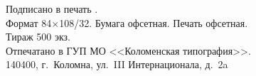\vfill
\centering
\begin{minipage}{0.8\tw}
	\small
	\centering
	Подписано в печать \signed.\\
	Формат 84$\times$108/32. Бумага офсетная. Печать офсетная.\\
	Тираж 500 экз.\\ 
	Отпечатано в ГУП МО <<Коломенская типография>>.\\ 140400, г.~Коломна, ул.~III Интернационала, д.~2a
\end{minipage}
\label{pg:last-page}